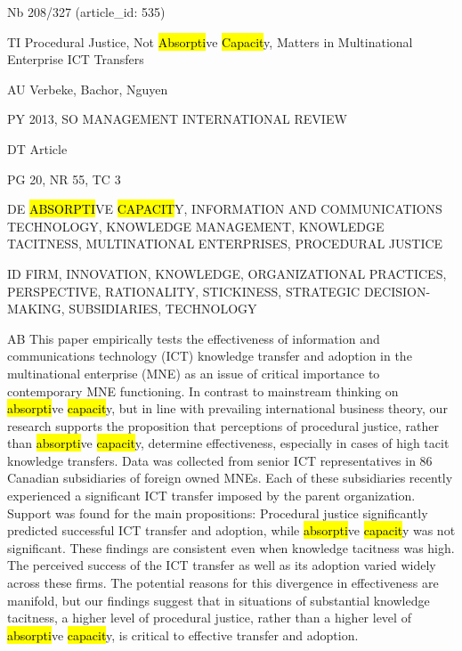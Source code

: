 \documentclass[a4paper]{article}
\begin{document}
\vspace*{-2cm}
Nb \tabto{0cm}208/327 (article\_id: 535)\par
TI \tabto{0cm}Procedural Justice, Not \hl{Absorpti}ve \hl{Capacit}y, Matters in Multinational Enterprise ICT Transfers\par
AU \tabto{0cm}Verbeke, Bachor, Nguyen\par
PY \tabto{0cm}2013, SO MANAGEMENT INTERNATIONAL REVIEW\par
DT \tabto{0cm}Article\par
PG \tabto{0cm}20, NR 55, TC 3\par
DE \tabto{0cm}\hl{ABSORPTI}VE \hl{CAPACIT}Y, INFORMATION AND COMMUNICATIONS TECHNOLOGY, KNOWLEDGE MANAGEMENT, KNOWLEDGE TACITNESS, MULTINATIONAL ENTERPRISES, PROCEDURAL JUSTICE\par
ID \tabto{0cm}FIRM, INNOVATION, KNOWLEDGE, ORGANIZATIONAL PRACTICES, PERSPECTIVE, RATIONALITY, STICKINESS, STRATEGIC DECISION-MAKING, SUBSIDIARIES, TECHNOLOGY\par
AB \tabto{0cm}This paper empirically tests the effectiveness of information and communications technology (ICT) knowledge transfer and adoption in the multinational enterprise (MNE) as an issue of critical importance to contemporary MNE functioning. In contrast to mainstream thinking on \hl{absorpti}ve \hl{capacit}y, but in line with prevailing international business theory, our research supports the proposition that perceptions of procedural justice, rather than \hl{absorpti}ve \hl{capacit}y, determine effectiveness, especially in cases of high tacit knowledge transfers.
Data was collected from senior ICT representatives in 86 Canadian subsidiaries of foreign owned MNEs. Each of these subsidiaries recently experienced a significant ICT transfer imposed by the parent organization.
Support was found for the main propositions: Procedural justice significantly predicted successful ICT transfer and adoption, while \hl{absorpti}ve \hl{capacit}y was not significant. These findings are consistent even when knowledge tacitness was high.
The perceived success of the ICT transfer as well as its adoption varied widely across these firms. The potential reasons for this divergence in effectiveness are manifold, but our findings suggest that in situations of substantial knowledge tacitness, a higher level of procedural justice, rather than a higher level of \hl{absorpti}ve \hl{capacit}y, is critical to effective transfer and adoption.\par
\clearpage
\end{document}
